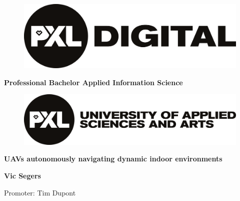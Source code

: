 \begin{titlepage}
  \thispagestyle{titlepage}
  \color{pxlgreen}
  \begin{figure}
    \centering
    \includegraphics[width=0.5\linewidth]{images/logo_pxl_digital.png}
  \end{figure}
  \vspace{\baselineskip}
  \begin{center}
    \LARGE\textbf{Professional Bachelor Applied Information Science}
  \end{center}
  \vspace{\baselineskip}
  \begin{figure}[h]
    \centering
    \includegraphics[width=0.7\linewidth]{images/logo_PXL_University_of_applied_sciences_and_arts.png}
  \end{figure}
  \begin{center}
    \Huge\textbf{UAVs autonomously navigating dynamic indoor environments}
  \end{center}
  \vspace{\baselineskip}
  \begin{center}
    \Large\textbf{Vic Segers}
  \end{center}
  \vspace{\baselineskip}
  \begin{center}
    \large{Promoter: Tim Dupont}
  \end{center}
\end{titlepage}